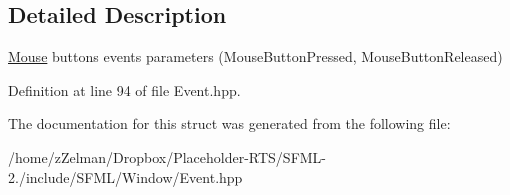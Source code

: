 \subsection{Detailed Description}
\hyperlink{classsf_1_1Mouse}{Mouse} buttons events parameters (Mouse\-Button\-Pressed, Mouse\-Button\-Released) 

Definition at line 94 of file Event.\-hpp.



The documentation for this struct was generated from the following file\-:\begin{DoxyCompactItemize}
\item 
/home/z\-Zelman/\-Dropbox/\-Placeholder-\/\-R\-T\-S/\-S\-F\-M\-L-\/2./include/\-S\-F\-M\-L/\-Window/Event.\-hpp\end{DoxyCompactItemize}
